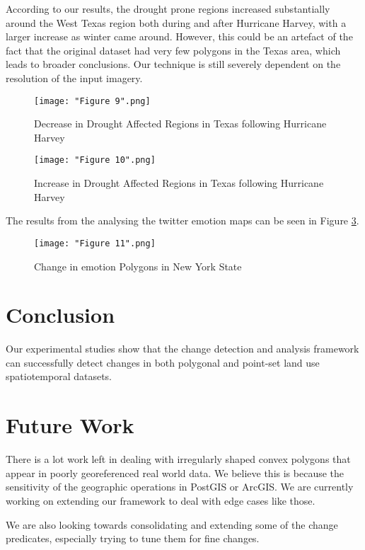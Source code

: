 \documentclass[conference]{IEEEtran}
\begin{document}
According to our results, the drought prone regions increased substantially around the West Texas region both during and after Hurricane Harvey, with a larger increase as winter came around. However, this could be an artefact of the fact that the original dataset had very few polygons in the Texas area, which leads to broader conclusions. Our technique is still severely dependent on the resolution of the input imagery.

\begin{figure}[ht]
\centerline{\texttt{[image: "Figure 9".png]}}
\caption{Decrease in Drought Affected Regions in Texas following Hurricane Harvey}
\label{Figure 9}
\end{figure}

\begin{figure}[ht]
\centerline{\texttt{[image: "Figure 10".png]}}
\caption{Increase in Drought Affected Regions in Texas following Hurricane Harvey}
\label{Figure 10}
\end{figure}

The results from the analysing the twitter emotion maps can be seen in Figure \ref{Figure 11}.

\begin{figure}[ht]
\centerline{\texttt{[image: "Figure 11".png]}}
\caption{Change in emotion Polygons in New York State}
\label{Figure 11}
\end{figure}

\section{Conclusion}

Our experimental studies show that the change detection and analysis framework can successfully detect changes in both polygonal and point-set land use spatiotemporal datasets. 
 

\section{Future Work}
There is a lot work left in dealing with irregularly shaped convex polygons that appear in poorly georeferenced real world data. We believe this is because the sensitivity of the geographic operations in PostGIS or ArcGIS. We are currently working on extending our framework to deal with edge cases like those.

We are also looking towards consolidating and extending some of the change predicates, especially trying to tune them for fine changes.
\end{document}
